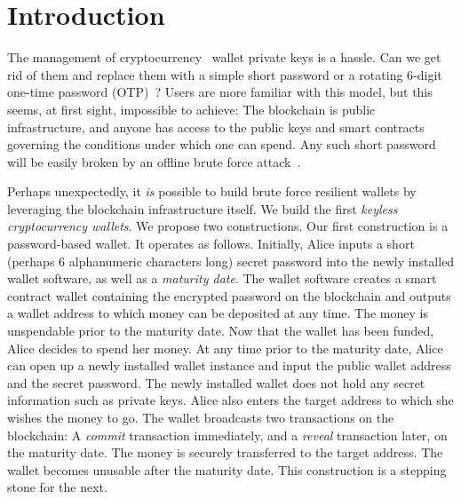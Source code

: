 \section{Introduction}

The management of cryptocurrency~\cite{bitcoin} wallet
private keys is a hassle.
Can we get rid of them and replace them with a simple short password or
a rotating $6$-digit one-time password (OTP)~\cite{rfc6238,rfc4226}? Users are more familiar with this
model, but this seems, at first sight, impossible to achieve:
The blockchain is public infrastructure, and anyone has access to the
public keys and smart contracts~\cite{buterin,wood} governing the conditions under which
one can spend. Any such short password will be easily broken by an offline
brute force attack~\cite{brain-drain}.

Perhaps unexpectedly, it \emph{is} possible to build brute force resilient wallets
by leveraging the blockchain infrastructure itself.
We build the first \emph{keyless cryptocurrency wallets}.
We propose two constructions. Our first construction is a password-based wallet.
It operates as follows.
Initially, Alice inputs a short (perhaps $6$ alphanumeric characters long) secret password into
the newly installed wallet software, as well as a \emph{maturity date}. The wallet software creates
a smart contract wallet containing the encrypted password on
the blockchain and outputs a wallet address to which money can be deposited at any time.
The money is unspendable prior to the maturity date.
Now that the wallet has been funded, Alice decides to spend her money.
At any time prior to the maturity date, Alice
can open up a newly installed wallet instance and input the public wallet address and the
secret password. The newly installed wallet does not hold any secret information such as
private keys. Alice also enters the target address to which she wishes the money to go.
The wallet broadcasts two transactions on the blockchain: A \emph{commit} transaction immediately,
and a \emph{reveal} transaction later, on the maturity date. The money is securely transferred to
the target address. The wallet becomes unusable after the maturity date. This construction
is a stepping stone for the next.

